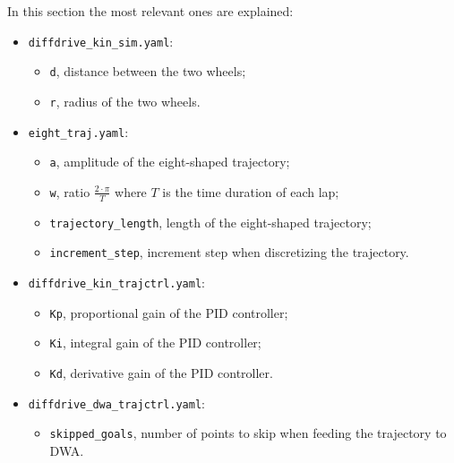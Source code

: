 \documentclass[11pt,a4paper]{article}
\begin{document}
In this section the most relevant ones are explained:\\
\begin{itemize}

    \item \texttt{diffdrive\_kin\_sim.yaml}:
        \begin{itemize}
            \item \texttt{d}, distance between the two wheels;
            \item \texttt{r}, radius of the two wheels.\\
        \end{itemize}

    \item \texttt{eight\_traj.yaml}:
        \begin{itemize}
            \item \texttt{a}, amplitude of the eight-shaped trajectory;
            \item \texttt{w}, ratio $\frac{2 \cdot \pi }{T}$ where $T$ is the time duration of each lap;
            \item \texttt{trajectory\_length}, length of the eight-shaped trajectory;
            \item \texttt{increment\_step}, increment step when discretizing the trajectory.\\
        \end{itemize}

    \item \texttt{diffdrive\_kin\_trajctrl.yaml}:
        \begin{itemize}
            \item \texttt{Kp}, proportional gain of the PID controller;
            \item \texttt{Ki}, integral gain of the PID controller;
            \item \texttt{Kd}, derivative gain of the PID controller.\\
        \end{itemize}

    \item \texttt{diffdrive\_dwa\_trajctrl.yaml}:
        \begin{itemize}
            \item \texttt{skipped\_goals}, number of points to skip when feeding the trajectory to DWA.\\
        \end{itemize}


\end{itemize}
\end{document}
